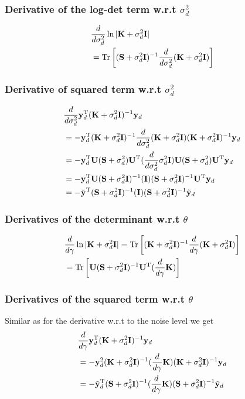 \documentclass{article}
\newcommand{\B}[1]{{\bf{#1}}}
\newcommand\tr{\mathrm{Tr}}
\begin{document}
\subsubsection{Derivative of the log-det term w.r.t $\sigma_d^{2}$}
\begin{align}&
\dsd \ln | \bfK + \sigma^2_d\B{I} |  \\
&  =  \Tr \left [ ( \bfS + \sigma_d^2\B{I})^{-1} \dsd (\bfK + \sigma_d^2 \B{I})\right]
\end{align}

\subsubsection{Derivative of squared term w.r.t $\sigma_d^{2}$}
\begin{align}&
\frac{{d}}{{d }\sigma^2_d} {\bf y}_d^{{\rm T}} ({\bf K} + \sigma_d^{2} {\bf I})^{-1} {\bf y}_d\\&
=- {\bf y}_d^{{\rm T}} ({\bf K} + \sigma_d^{2} {\bf I})^{-1} \frac{{d}}{{d }\sigma^2_d} ({\bf K} +
\sigma_d^{2} {\bf I}) ({\bf K} + \sigma_d^{2} {\bf I})^{-1} {\bf y}_d\\ &
=- {\bf y}_d^{{\rm T}} {\bf U} ( {\bf S} + \sigma_d^{2} ) {\bf U}^{{\rm T}} (\frac{{d}}{{d }\sigma^2_d}
\sigma_d^{2} {\bf I}) {\bf U} ({\bf S} + \sigma_d^{2}) {\bf U}^{{\rm T}} {\bf y}_d\\&
=- {\bf y}_d^{{\rm T}} {\bf U} ({\bf S} + \sigma_d^{2} {\bf I})^{-1} ({\bf I}) ({\bf S} +
\sigma_d^{2} {\bf I})^{-1} {\bf U}^{{\rm T}} {\bf y}_d \\&
= - \tilde{{\bf y}}^{{\rm T}}  ({\bf S} + \sigma_d^{2} {\bf I})^{-1} ({\bf I}) ({\bf S} +
\sigma_d^{2} {\bf I})^{-1} \tilde{{\bf y}}_d 
\end{align}

\subsubsection{Derivatives of the determinant w.r.t $\theta$}

\begin{align}&
\dg \ln | \bfK + \sigma_d^{2} \unit| = \tr \left [ (\bfK +
  \sigma_d^{2} \unit)^{-1} \dg (\bfK + \sigma_d^{2} \unit) \right ]
\\&
=\tr \left [  \bfU (\bfS + \sigma_d^{2} \unit)^{-1} \bfU^{\T}  (\dg \bfK) \right ]
\end{align}


\subsubsection{Derivatives of the squared term w.r.t $\theta$}
Similar as for the derivative w.r.t to the noise level we get
\begin{align}&
\frac{{d}}{{d }\gamma} {\bf y}_d^{{\rm T}} ({\bf K} + \sigma_d^{2} {\bf I})^{-1} {\bf y}_d \\ &
= - {\bf y}_d^{2} ({\bf K} + \sigma_d^{2} {\bf I})^{-1} (\frac{{d}}{{d }\gamma} {\bf K}) ({\bf K} +
\sigma_d^{2} {\bf I})^{-1} {\bf y}_d\\ &
= -\tilde{{\bf y}}_d^{{\rm T}} ({\bf S}+ \sigma_d^{2} {\bf I})^{-1} (\frac{{d}}{{d }\gamma} {\bf K}) ({\bf S} +
\sigma_d^{2} {\bf I})^{-1} \tilde{{\bf y}}_d
\end{align}



\newpage
\end{document}
